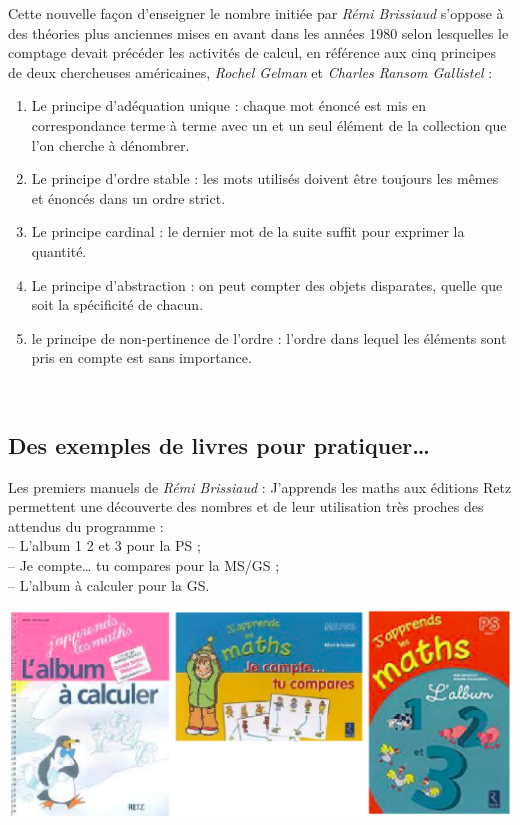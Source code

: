    Cette \og nouvelle \fg{} façon d'enseigner le nombre initiée par {\it Rémi Brissiaud} s'oppose à des théories plus anciennes mises en avant dans les années 1980 selon lesquelles le comptage devait précéder les activités de calcul, en référence aux cinq principes de deux chercheuses américaines, {\it Rochel Gelman} et {\it Charles Ransom Gallistel} :
{\renewcommand{\StringDOCUMENTATION}{Principes de Gelman}
\begin{documentation}
   \begin{enumerate}
      \item Le principe d’adéquation unique : chaque mot énoncé est mis en correspondance terme à terme avec un et un seul élément de la collection que l’on cherche à dénombrer.
      \item Le principe d’ordre stable : les mots utilisés doivent être toujours les mêmes et énoncés dans un ordre strict.
     \item Le principe cardinal : le dernier mot de la suite suffit pour exprimer la quantité.
      \item Le principe d’abstraction : on peut compter des objets disparates, quelle que soit la spécificité de chacun.
      \item le principe de non-pertinence de l’ordre : l’ordre dans lequel les éléments sont pris en compte est sans importance.
   \end{enumerate}
   \ \\ [-12mm]
\end{documentation}}


\subsection{Des exemples de livres pour pratiquer\dots}

   Les premiers manuels de {\it Rémi Brissiaud} : \og J'apprends les maths \fg{} aux éditions Retz permettent une découverte des nombres et de leur utilisation très proches des attendus du programme : \\
   -- L'album 1 2 et 3 pour la PS ; \\
   -- Je compte\dots{} tu compares pour la MS/GS ; \\
   -- L'album à calculer pour la GS.

\begin{center}
   \includegraphics[width=17cm]{Nombres_et_calculs_did/Images/Num1_cours_livres}
\end{center}

